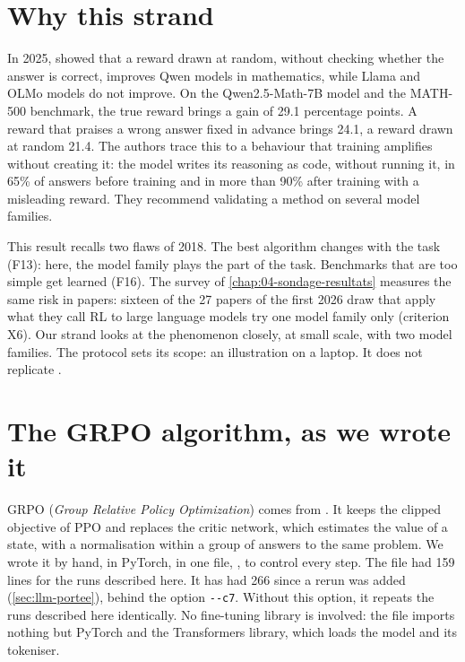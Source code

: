 \section{Why this strand}
\label{sec:llm-pourquoi}

In 2025, \textcite{shao2025spurious} showed that a reward drawn at random, without checking whether
the answer is correct, improves Qwen models in mathematics, while Llama and OLMo models do not
improve. On the Qwen2.5-Math-7B model and the MATH-500 benchmark, the true reward brings a gain of
29.1 percentage points. A reward that praises a wrong answer fixed in advance brings 24.1, a reward
drawn at random 21.4. The authors trace this to a behaviour that training amplifies without creating
it: the model writes its reasoning as code, without running it, in 65\% of answers before training
and in more than 90\% after training with a misleading reward. They recommend validating a method on
several model families.

This result recalls two flaws of 2018. The best algorithm changes with the task (F13): here, the
model family plays the part of the task. Benchmarks that are too simple get learned (F16). The survey of \cref{chap:04-sondage-resultats}
measures the same risk in papers: sixteen of the 27 papers of the first 2026 draw that apply what
they call RL to large language models try one model family only (criterion X6). Our strand looks at
the phenomenon closely, at small scale, with two model families. The protocol sets its scope: an
illustration on a laptop. It does not replicate \textcite{shao2025spurious}.

\section{The GRPO algorithm, as we wrote it}
\label{sec:grpo}

GRPO (\emph{Group Relative Policy Optimization}) comes from \textcite{shao2024deepseekmath}. It keeps
the clipped objective of PPO \parencite{schulman2017ppo} and replaces the critic network, which
estimates the value of a state, with a normalisation within a group of answers to the same problem.
We wrote it by hand, in PyTorch, in one file, , to control every step. The file
had 159 lines for the runs described here. It has had 266 since a rerun was added (\cref{sec:llm-portee}),
behind the option \texttt{-{}-c7}. Without this option, it repeats the runs described here identically. No
fine-tuning library is involved: the file imports nothing but PyTorch and the Transformers library,
which loads the model and its tokeniser.

